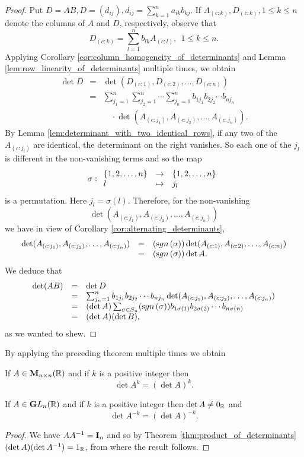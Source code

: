 \begin{proof}
Put $D = AB, D = (d_{ij}), d_{ij} = \sum _{k = 1} ^n
a_{ik}b_{kj}$. If $A_{(c:k)}, D_{(c:k)}, 1 \leq k \leq n$ denote
the columns of $A$ and $D$, respectively, observe that $$
D_{(c:k)} = \sum _{l = 1} ^n b_{lk}A_{(c:l)}, \    \  1 \leq k
\leq n.
$$
Applying Corollary \ref{cor:column_homogeneity_of_determinants}
and Lemma \ref{lem:row_linearity_of_determinants} multiple times,
we obtain
$$\begin{array}{lll}\det D  & =  & \det (D_{(c:1)},  D_{(c:2)}, \ldots , D_{(c:n)}) \\ &
=&  \sum _{j_1 = 1} ^n\sum _{j_2 = 1} ^n \cdots \sum _{j_n = 1} ^n
b_{1j_1}b_{2j_2}\cdots b_{nj_n}\\ & & \quad \cdot\det
(A_{(c:j_1)}, A_{(c:j_2)}, \ldots , A_{(c:j_n)}). \end{array}
$$
By Lemma \ref{lem:determinant_with_two_identical_rows}, if any two
of the $A_{(c:j_l)}$ are identical, the determinant on the right
vanishes. So each one of the $j_l$ is different in the
non-vanishing terms and so the map
$$\fun{\sigma}{l}{j_l}{\{1, 2, \ldots , n\}}{\{1, 2, \ldots , n\}}
$$is a permutation. Here $j_l = \sigma (l)$. Therefore, for the non-vanishing $$\det (A_{(c:j_1)},  A_{(c:j_2)},
\ldots , A_{(c:j_n)})$$ we have in view of Corollary
\ref{cor:alternating_determinants},  $$\begin{array}{lll}\det
(A_{(c:j_1)}, A_{(c:j_2)}, \ldots , A_{(c:j_n)}) & = &
(\sgn{\sigma})\det (A_{(c:1)}, A_{(c:2)}, \ldots , A_{(c:n)}) \\ &
= &(\sgn{\sigma})\det A.\end{array}$$We deduce that
$$\begin{array}{lll}\det (AB) & = & \det D \\ & = & \sum _{j_n = 1} ^n
b_{1j_1}b_{2j_2}\cdots b_{nj_n}\det (A_{(c:j_1)},  A_{(c:j_2)},
\ldots , A_{(c:j_n)})\\
&  = & (\det A) \sum _{\sigma\in S_n} (\sgn{\sigma}) b_{1\sigma
(1)}b_{2\sigma (2)}\cdots b_{n\sigma (n)}\\
& = & (\det A)(\det B),
\end{array}$$as we wanted to shew.
\end{proof}
By applying the preceding theorem multiple times we obtain
\begin{cor}
If $A\in{\mathbf M}_{n\times n}( \mathbb{R})$ and if $k$ is a positive integer
then $$ \det A^k = (\det A)^k.
$$
\end{cor}
\begin{cor}
If $A\in{\mathbf GL}_{n}( \mathbb{R})$ and if $k$ is a positive integer then $\det
A \neq 0_{\mathbb{R}}$ and
$$ \det A^{-k} = (\det A)^{-k}.
$$
\end{cor}
\begin{proof}
We have $AA^{-1} = {\textbf  I}_n$ and so by Theorem
\ref{thm:product_of_determinants} $(\det A)(\det A^{-1}) = 1_{\mathbb{R}
}$, from where the result follows.
\end{proof}

